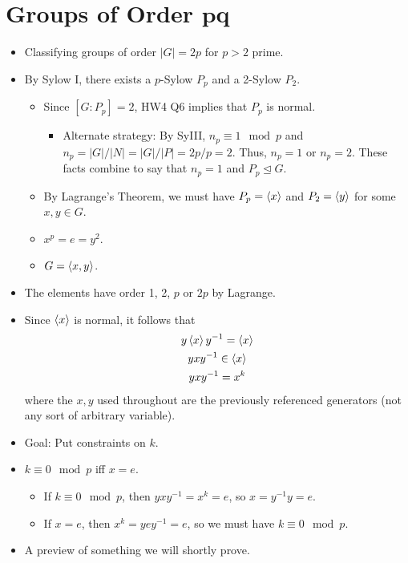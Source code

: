 \documentclass[../notes.tex]{subfiles}
\begin{document}
\section[Groups of Order \texorpdfstring{$pq$}{TEXT}]{Groups of Order \texorpdfstring{$\bm{pq}$}{TEXT}}
\begin{itemize}
    \item {}Classifying groups of order $|G|=2p$ for $p>2$ prime.
    \item By Sylow I, there exists a $p$-Sylow $P_p$ and a 2-Sylow $P_2$.
    \begin{itemize}
        \item Since $[G:P_p]=2$, HW4 Q6 implies that $P_p$ is normal.
        \begin{itemize}
            \item Alternate strategy: By SyIII, $n_p\equiv 1\mod p$ and $n_p=|G|/|N|=|G|/|P|=2p/p=2$. Thus, $n_p=1$ or $n_p=2$. These facts combine to say that $n_p=1$ and $P_p\trianglelefteq G$.
        \end{itemize}
        \item By Lagrange's Theorem, we must have $P_p=\left\langle{x}\right\rangle$ and $P_2=\left\langle{y}\right\rangle$ for some $x,y\in G$.
        \item $x^p=e=y^2$.
        \item $G=\left\langle{x,y}\right\rangle$.
    \end{itemize}
    \item The elements have order 1, 2, $p$ or $2p$ by Lagrange.
    \item Since $\left\langle{x}\right\rangle$ is normal, it follows that
    \begin{gather*}
        y\left\langle{x}\right\rangle y^{-1} = \left\langle{x}\right\rangle\\
        yxy^{-1}\in\left\langle{x}\right\rangle\\
        yxy^{-1}=x^k
    \end{gather*}
    where the $x,y$ used throughout are the previously referenced generators (not any sort of arbitrary variable).
    \item Goal: Put constraints on $k$.
    \item $k\equiv 0\mod p$ iff $x=e$.
    \begin{itemize}
        \item If $k\equiv 0\mod p$, then $yxy^{-1}=x^k=e$, so $x=y^{-1}y=e$.
        \item If $x=e$, then $x^k=yey^{-1}=e$, so we must have $k\equiv 0\mod p$.
    \end{itemize}
    \item A preview of something we will shortly prove.

\end{itemize}
\end{document}
